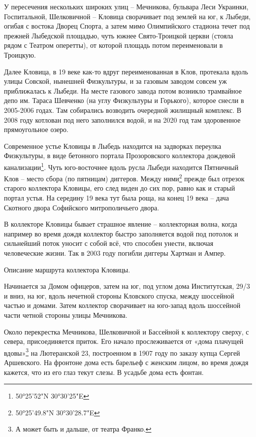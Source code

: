 У пересечения нескольких широких улиц – Мечникова, бульвара Леси Украинки, Госпитальной, Шелковичной – Кловица сворачивает под землей на юг, к Лыбеди, огибая с востока Дворец Спорта, а затем мимо Олимпийского стадиона течет под прежней Лыбедской площадью, чуть южнее Свято-Троицкой церкви (стояла рядом с Театром оперетты), от которой площадь потом переименовали в Троицкую.

Далее Кловица, в 19 веке как-то вдруг переименованная в Клов, протекала вдоль улицы Совской, нынешней Физкультуры, и за газовым заводом совсем уж приближалась к Лыбеди. На месте газового завода потом возникло трамвайное депо им. Тараса Шевченко (на углу Физкультуры и Горького), которое снесли в 2005-2006 годах. Там собирались возводить очередной жилищный комплекс. В 2008 году котлован под него заполнился водой, и на 2020 год там здоровенное прямоугольное озеро.

Современное устье Кловицы в Лыбедь находится на задворках переулка Физкультуры, в виде бетонного портала Прозоровского коллектора дождевой канализации\footnote{50°25'52"N 30°30'25"E}. Чуть юго-восточнее вдоль русла Лыбеди находится Пятничный Клов – место сбора (по пятницам) диггеров. Между ними\footnote{50°25'49.8"N 30°30'28.7"E} прежде был отрезок старого коллектора Кловицы, его след виден до сих пор, равно как и старый портал устья. На середину 19 века тут была роща, на конец 19 века – дача Скотного двора Софийского митрополичьего двора.

В коллекторе Кловицы бывает страшное явление – коллекторная волна, когда например во время дождя коллектор быстро заполняется водой под потолок и сильнейший поток уносит с собой всё, что способен унести, включая человеческие жизни. Так в 2003 году погибли диггеры Хартман и Ампер.

Описание маршрута коллектора Кловицы.

Начинается за Домом офицеров, затем на юг, под углом дома Институтская, 29/3 и вниз, на юг, вдоль нечетной стороны Кловского спуска, между шоссейной частью и домами. Затем коллектор сворачивает на юго-запад вдоль шоссейной части четной стороны улицы Мечникова.

Около перекрестка Мечникова, Шелковичной и Бассейной к коллектору сверху, с севера, присоединяется приток. Его начало прослеживается от «дома плачущей вдовы»\footnote{А может быть и дальше, от театра Франко.} на Лютеранской 23, построенном в 1907 году по заказу купца Сергей Аршевского. На фронтоне дома есть барельеф с женским лицом, во время дождя кажется, что из его глаз текут слезы. В усадьбе дома есть фонтан.

